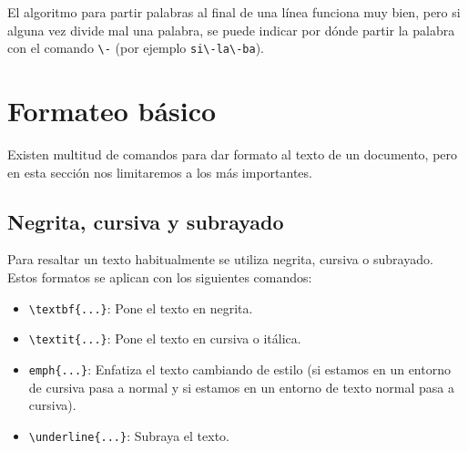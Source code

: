 \documentclass[
  letterpaper,
  DIV=11,
  numbers=noendperiod]{scrreport}
\providecommand{\tightlist}{%
  \setlength{\itemsep}{0pt}\setlength{\parskip}{0pt}}\usepackage{longtable,booktabs,array}
\begin{document}
\begin{tcolorbox}[enhanced jigsaw, opacitybacktitle=0.6, coltitle=black, colbacktitle=quarto-callout-warning-color!10!white, title=\textcolor{quarto-callout-warning-color}{\faExclamationTriangle}\hspace{0.5em}{Advertencia}, colback=white, toprule=.15mm, breakable, opacityback=0, left=2mm, rightrule=.15mm, toptitle=1mm, colframe=quarto-callout-warning-color-frame, bottomtitle=1mm, titlerule=0mm, arc=.35mm, bottomrule=.15mm, leftrule=.75mm]
El algoritmo para partir palabras al final de una línea funciona muy
bien, pero si alguna vez divide mal una palabra, se puede indicar por
dónde partir la palabra con el comando \texttt{\textbackslash{}-} (por
ejemplo \texttt{si\textbackslash{}-la\textbackslash{}-ba}).
\end{tcolorbox}


\hypertarget{formateo-buxe1sico}{%
\chapter{Formateo básico}\label{formateo-buxe1sico}}

Existen multitud de comandos para dar formato al texto de un documento,
pero en esta sección nos limitaremos a los más importantes.

\hypertarget{negrita-cursiva-y-subrayado}{%
\section{Negrita, cursiva y
subrayado}\label{negrita-cursiva-y-subrayado}}

Para resaltar un texto habitualmente se utiliza negrita, cursiva o
subrayado. Estos formatos se aplican con los siguientes comandos:

\begin{itemize}
\tightlist
\item
  \texttt{\textbackslash{}textbf\{...\}}: Pone el texto en negrita.
\item
  \texttt{\textbackslash{}textit\{...\}}: Pone el texto en cursiva o
  itálica.
\item
  \texttt{emph\{...\}}: Enfatiza el texto cambiando de estilo (si
  estamos en un entorno de cursiva pasa a normal y si estamos en un
  entorno de texto normal pasa a cursiva).
\item
  \texttt{\textbackslash{}underline\{...\}}: Subraya el texto.
\end{itemize}
\end{document}
